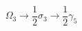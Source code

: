 \begin{equation}
\Omega_{3} \rightarrow \frac{1}{2} \sigma_{3} \rightarrow \frac{1}{2}
\gamma_{5} 
\end{equation}

